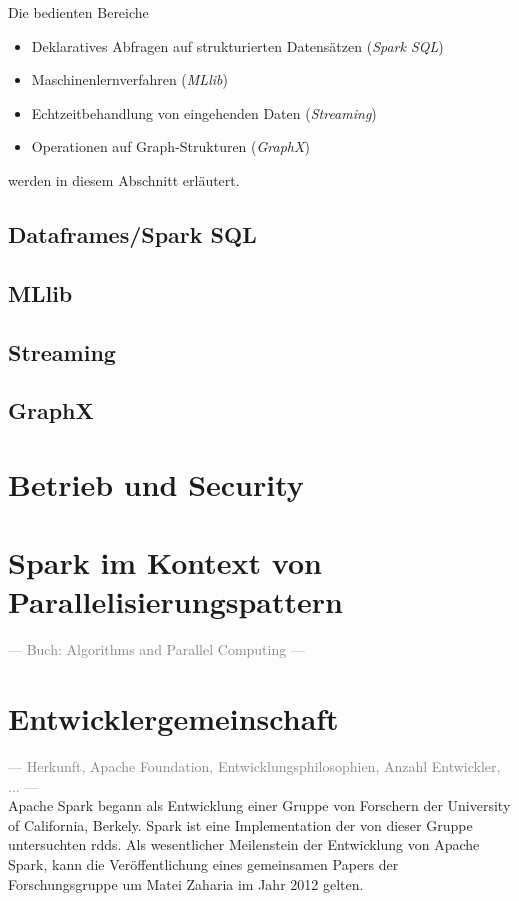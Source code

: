 Die bedienten Bereiche
\begin{itemize}
	\item Deklaratives Abfragen auf strukturierten Datensätzen (\textit{Spark SQL})
	\item Maschinenlernverfahren (\textit{MLlib})
	\item Echtzeitbehandlung von eingehenden Daten (\textit{Streaming})
	\item Operationen auf Graph-Strukturen (\textit{GraphX})
\end{itemize}
werden in diesem Abschnitt erläutert.

\subsection{Dataframes/Spark SQL}
\cite{Armbrust:2015:SSR:2723372.2742797}

\subsection{MLlib}
\subsection{Streaming}
\subsection{GraphX}
\cite{Gonzalez:2014:GGP:2685048.2685096}

\section{Betrieb und Security}

\section{Spark im Kontext von Parallelisierungspattern}
\textcolor{gray}{--- Buch: Algorithms and Parallel Computing ---}\\

\section{Entwicklergemeinschaft}
\textcolor{gray}{--- Herkunft, Apache Foundation, Entwicklungsphilosophien, Anzahl Entwickler, ... ---}\\

Apache Spark begann als Entwicklung einer Gruppe von Forschern der University of California, Berkely. Spark ist eine Implementation der von dieser Gruppe untersuchten \glspl{rdd}\cite{Mat12}. Als wesentlicher Meilenstein der Entwicklung von Apache Spark, kann die Veröffentlichung eines gemeinsamen Papers der Forschungsgruppe um Matei Zaharia im Jahr 2012 gelten.\\

